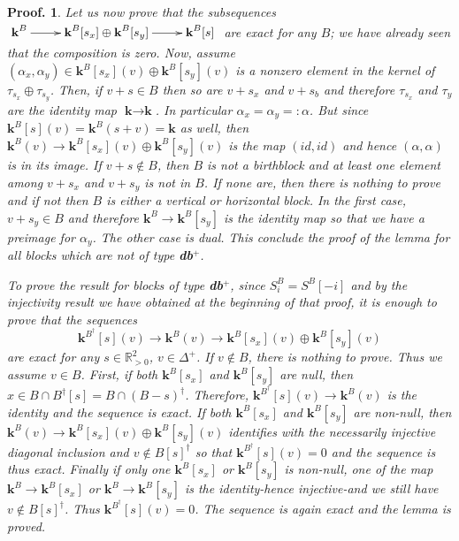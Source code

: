 \documentclass[a4paper, english, 11pt]{article}
\newcommand{\kk}[0]{\textbf{k}}
\newcommand{\0}{\vec{0}}
\newcommand{\R}[0]{\mathbb{R}}
\newtheorem*{pf}{Proof.} }
\begin{document}
\begin{pf}
 Let us now prove that the subsequences $ \xymatrix{\kk^B \ar[r] & \kk^B[s_x] \oplus \kk^B[s_y] \ar[r] & \kk^B[s]}$ are exact for any $B$; we have already seen that the composition is zero. Now, assume $(\alpha_x, \alpha_y) \in  \kk^B[s_x](v) \oplus \kk^B[s_y](v)$ is a \emph{nonzero} element in the kernel of $\tau_{s_x} \oplus \tau_{s_y}$. Then, if $v+s \in B$ then so are $v+s_x$ and $v+s_b$ and therefore $\tau_{s_x}$ and $\tau_{y}$ are the identity map $\kk \to \kk$. In particular $\alpha_x=\alpha_y=:\alpha$. But since $\kk^{B}[s](v)= \kk^{B}(s+v)=\kk$ as well, then $\kk^B(v)\to  
  \kk^B[s_x](v) \oplus \kk^B[s_y](v)$ is the map $(id, id)$ and hence $(\alpha, \alpha)$ is in its image. If $v+s\notin B$, then $B$ is not a birthblock and at least one element among $v+s_x$ and $v+s_y$ is not in $B$. If none are, then there is nothing to prove and if not then $B$ is either a vertical or horizontal block. In the first case, $v+s_y \in B$ and therefore $\kk^B \to \kk^B[s_y]$ is the identity map so that we have a preimage for $\alpha_y$. The other case is dual. This conclude the proof of the lemma for all blocks which are not of type \textbf{db}$^+$. 
 
 \smallskip 
 
 To prove the result for blocks of type \textbf{db}$^+$, since $S_i^B = S^B [-i]$ and by the injectivity result we have obtained at the beginning of that proof, it is enough to prove that the sequences 
 $$ \kk^{B^\dagger}[s](v) \to \kk^B(v) \to \kk^B[s_x](v)\oplus \kk^B[s_y](v)  $$
 are exact for any $s\in \R^2_{>0}$, $v\in \Delta^+$. If $v\notin B$, there is nothing to prove. Thus we assume $v\in B$.
 First, if both $\kk^B[s_x]$ and $\kk^B[s_y]$ are null, then  $x\in B\cap B^\dagger[s]= B\cap (B-s)^{\dagger}$. 
 Therefore, $\kk^{B^\dagger}[s](v) \to \kk^B(v)$ is the identity and the sequence is exact. 
 If both $\kk^B[s_x]$ and $\kk^B[s_y]$ are non-null, then $\kk^B(v) \to \kk^B[s_x](v)\oplus \kk^B[s_y](v) $ identifies with the necessarily injective diagonal inclusion and $v\notin B[s]^\dagger$ so that $\kk^{B^\dagger}[s](v)=0$ and the sequence is thus exact. 
 Finally if only one $\kk^B[s_x]$ or $\kk^B[s_y]$ is non-null, one of the map $\kk^B\to \kk^B[s_x]$ or $\kk^B\to \kk^B[s_y]$  is the identity-hence injective-and  we still have $v\notin B[s]^\dagger$. Thus  $\kk^{B^\dagger}[s](v)=0$. The sequence is again exact and the lemma is proved.
 \end{pf}
\end{document}
